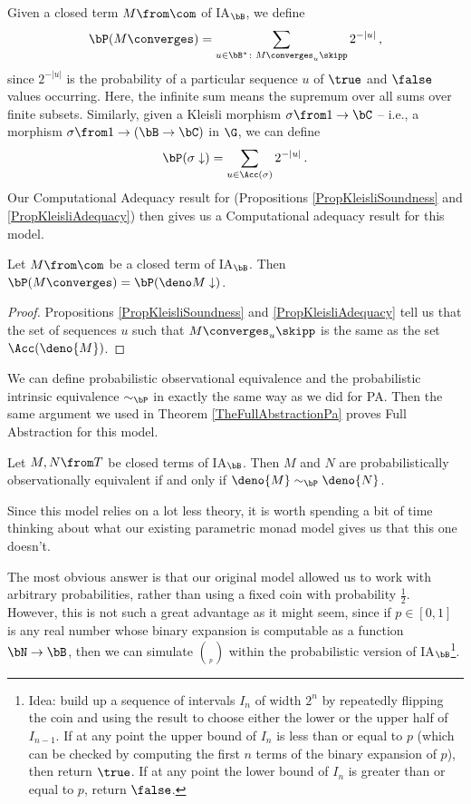 Given a closed term $M\from\com$ of IA${}_\bB$, we define
\[
  \bP(M\converges) = \sum_{u\in\bB^*\colon M\converges_u\skipp} 2^{-|u|}\,,
  \]
since $2^{-|u|}$ is the probability of a particular sequence $u$ of $\true$ and $\false$ values occurring.
Here, the infinite sum means the supremum over all sums over finite subsets.
Similarly, given a Kleisli morphism $\sigma\from 1 \to \bC$ -- i.e., a morphism $\sigma\from 1 \to (\bB \to \bC)$ in $\G$, we can define
\[
  \bP(\sigma\downarrow) = \sum_{u\in\Acc(\sigma)} 2^{-|u|}\,.
  \]
Our Computational Adequacy result for \IAX (Propositions \ref{PropKleisliSoundness} and \ref{PropKleisliAdequacy}) then gives us a Computational adequacy result for this model.

\begin{proposition}
  Let $M\from \com$ be a closed term of IA${}_\bB$.  
  Then $\bP(M\converges) = \bP(\deno M\downarrow)$.
\end{proposition}
\begin{proof}
  Propositions \ref{PropKleisliSoundness} and \ref{PropKleisliAdequacy} tell us that the set of sequences $u$ such that $M\converges_u\skipp$ is the same as the set $\Acc(\deno{M})$.
\end{proof}

We can define probabilistic observational equivalence and the probabilistic intrinsic equivalence $\sim_{\bP}$ in exactly the same way as we did for PA.  
Then the same argument we used in Theorem \ref{TheFullAbstractionPa} proves Full Abstraction for this model.

\begin{theorem}
  Let $M,N\from T$ be closed terms of IA${}_\bB$.  
  Then $M$ and $N$ are probabilistically observationally equivalent if and only if $\deno{M}\sim_{\bP}\deno{N}$.
\end{theorem}

Since this model relies on a lot less theory, it is worth spending a bit of time thinking about what our existing parametric monad model gives us that this one doesn't.

The most obvious answer is that our original model allowed us to work with arbitrary probabilities, rather than using a fixed coin with probability $\frac12$.  
However, this is not such a great advantage as it might seem, since if $p\in[0,1]$ is any real number whose binary expansion is computable as a function $\bN \to \bB$, then we can simulate $\choose_p$ within the probabilistic version of IA${}_\bB$\footnote{Idea: build up a sequence of intervals $I_n$ of width $2^n$ by repeatedly flipping the coin and using the result to choose either the lower or the upper half of $I_{n-1}$.  
If at any point the upper bound of $I_n$ is less than or equal to $p$ (which can be checked by computing the first $n$ terms of the binary expansion of $p$), then return $\true$.  
If at any point the lower bound of $I_n$ is greater than or equal to $p$, return $\false$.}.

